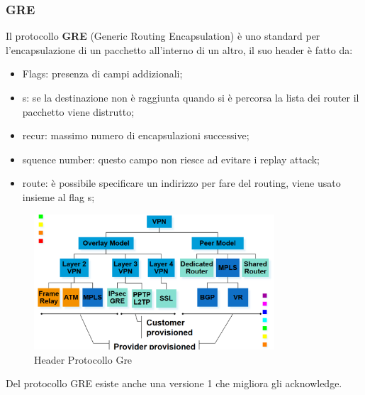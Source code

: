 \documentclass[12pt]{article}
\begin{document}
\subsubsection{GRE}
Il protocollo \textbf{GRE} (Generic Routing Encapsulation) \`e uno standard per l'encapsulazione di un pacchetto all'interno di un altro, il suo header \`e fatto da:
\begin{itemize}
    \item Flags: presenza di campi addizionali;
    \item s: se la destinazione non \`e raggiunta quando si \`e percorsa la lista dei router il pacchetto viene distrutto;
    \item recur: massimo numero di encapsulazioni successive;
    \item squence number: questo campo non riesce ad evitare i replay attack;
    \item route: \`e possibile specificare un indirizzo per fare del routing, viene usato insieme al flag s;
\end{itemize}
\begin{figure}[H]
    \centering
    \includegraphics[width=0.8\textwidth]{header-protocollo-gre.png}
    \caption{Header Protocollo Gre}
    \label{fig:header-protocollo-gre}
\end{figure}
Del protocollo GRE esiste anche una versione 1 che migliora gli acknowledge.
\end{document}
